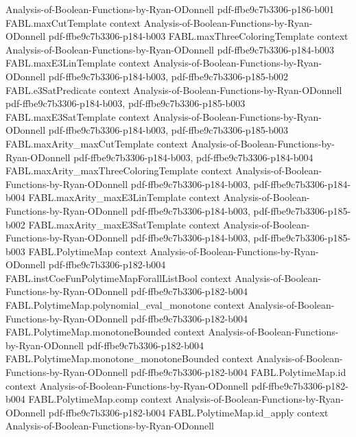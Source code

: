 \begin{theorem}
  {Analysis-of-Boolean-Functions-by-Ryan-ODonnell}
  {pdf-ffbe9c7b3306-p186-b001}
\proofstep
  {FABL.maxCutTemplate}
  {context}
  {Analysis-of-Boolean-Functions-by-Ryan-ODonnell}
  {pdf-ffbe9c7b3306-p184-b003}
\proofstep
  {FABL.maxThreeColoringTemplate}
  {context}
  {Analysis-of-Boolean-Functions-by-Ryan-ODonnell}
  {pdf-ffbe9c7b3306-p184-b003}
\proofstep
  {FABL.maxE3LinTemplate}
  {context}
  {Analysis-of-Boolean-Functions-by-Ryan-ODonnell}
  {pdf-ffbe9c7b3306-p184-b003,
    pdf-ffbe9c7b3306-p185-b002}
\proofstep
  {FABL.e3SatPredicate}
  {context}
  {Analysis-of-Boolean-Functions-by-Ryan-ODonnell}
  {pdf-ffbe9c7b3306-p184-b003,
    pdf-ffbe9c7b3306-p185-b003}
\proofstep
  {FABL.maxE3SatTemplate}
  {context}
  {Analysis-of-Boolean-Functions-by-Ryan-ODonnell}
  {pdf-ffbe9c7b3306-p184-b003,
    pdf-ffbe9c7b3306-p185-b003}
\proofstep
  {FABL.maxArity_maxCutTemplate}
  {context}
  {Analysis-of-Boolean-Functions-by-Ryan-ODonnell}
  {pdf-ffbe9c7b3306-p184-b003,
    pdf-ffbe9c7b3306-p184-b004}
\proofstep
  {FABL.maxArity_maxThreeColoringTemplate}
  {context}
  {Analysis-of-Boolean-Functions-by-Ryan-ODonnell}
  {pdf-ffbe9c7b3306-p184-b003,
    pdf-ffbe9c7b3306-p184-b004}
\proofstep
  {FABL.maxArity_maxE3LinTemplate}
  {context}
  {Analysis-of-Boolean-Functions-by-Ryan-ODonnell}
  {pdf-ffbe9c7b3306-p184-b003,
    pdf-ffbe9c7b3306-p185-b002}
\proofstep
  {FABL.maxArity_maxE3SatTemplate}
  {context}
  {Analysis-of-Boolean-Functions-by-Ryan-ODonnell}
  {pdf-ffbe9c7b3306-p184-b003,
    pdf-ffbe9c7b3306-p185-b003}
\proofstep
  {FABL.PolytimeMap}
  {context}
  {Analysis-of-Boolean-Functions-by-Ryan-ODonnell}
  {pdf-ffbe9c7b3306-p182-b004}
\proofstep
  {FABL.instCoeFunPolytimeMapForallListBool}
  {context}
  {Analysis-of-Boolean-Functions-by-Ryan-ODonnell}
  {pdf-ffbe9c7b3306-p182-b004}
\proofstep
  {FABL.PolytimeMap.polynomial_eval_monotone}
  {context}
  {Analysis-of-Boolean-Functions-by-Ryan-ODonnell}
  {pdf-ffbe9c7b3306-p182-b004}
\proofstep
  {FABL.PolytimeMap.monotoneBounded}
  {context}
  {Analysis-of-Boolean-Functions-by-Ryan-ODonnell}
  {pdf-ffbe9c7b3306-p182-b004}
\proofstep
  {FABL.PolytimeMap.monotone_monotoneBounded}
  {context}
  {Analysis-of-Boolean-Functions-by-Ryan-ODonnell}
  {pdf-ffbe9c7b3306-p182-b004}
\proofstep
  {FABL.PolytimeMap.id}
  {context}
  {Analysis-of-Boolean-Functions-by-Ryan-ODonnell}
  {pdf-ffbe9c7b3306-p182-b004}
\proofstep
  {FABL.PolytimeMap.comp}
  {context}
  {Analysis-of-Boolean-Functions-by-Ryan-ODonnell}
  {pdf-ffbe9c7b3306-p182-b004}
\proofstep
  {FABL.PolytimeMap.id_apply}
  {context}
  {Analysis-of-Boolean-Functions-by-Ryan-ODonnell}

\end{theorem}
